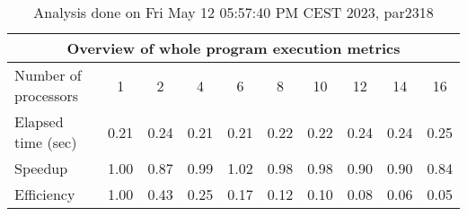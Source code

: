 \begin{table}[h]
\begin{center}
\begin{tabular}{|l|c|c|c|c|c|c|c|c|c|}
\hline
\multicolumn{10}{|c|}{Overview of whole program execution metrics} \\
\hline
\hline
Number of processors & 1 & 2 & 4 & 6 & 8 & 10 & 12 & 14 & 16 \\
\hline
Elapsed time (sec)      &       0.21 &       0.24 &       0.21 &       0.21 &       0.22 &       0.22 &       0.24 &       0.24 &       0.25 \\
\hline
Speedup                 &       1.00 &       0.87 &       0.99 &       1.02 &       0.98 &       0.98 &       0.90 &       0.90 &       0.84 \\
\hline
Efficiency              &       1.00 &       0.43 &       0.25 &       0.17 &       0.12 &       0.10 &       0.08 &       0.06 &       0.05 \\
\hline
\end{tabular}
\end{center}
\caption{ Analysis done on Fri May 12 05:57:40 PM CEST 2023, par2318}
\end{table}
